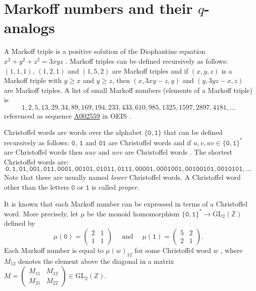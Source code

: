 \documentclass[a4paper,12pt]{amsart}
\newcommand{\GL}{\mathrm{GL}}
\newcommand{\M}{{\mathcal M}}
\newcommand{\0}{\mathtt{0}}
\newcommand{\1}{\mathtt{1}}
\newcommand{\2}{\mathtt{2}}
\newcommand{\3}{\mathtt{3}}
\begin{document}
\section{Markoff numbers and their \texorpdfstring{$q$}{q}-analogs}
\label{sec:Markoff}

A Markoff triple is a positive solution of the Diophantine equation
$x^2+y^2+z^2=3xyz$ \cite{MR1510073,M1879}.
Markoff triples can be defined recursively as follows:
$(1,1,1)$, $(1,2,1)$ and $(1,5,2)$ are Markoff triples and if
$(x,y,z)$ is a Markoff triple with $y\geq x$ and $y\geq z$, then
$(x,3xy-z,y)$ and $(y,3yz-x,z)$ are Markoff triples.
A list of small Markoff numbers (elements of a Markoff triple) is
\[
    1,2,5,13,29,34,89,169,194,233,433,610,985,1325,1597,2897,4181,
    \ldots
\]
referenced as sequence \href{https://oeis.org/A002559}{A002559} in OEIS \cite{OEISA005132}.

Christoffel words are words over the alphabet $\{\0,\1\}$ that can be defined
recursively as follows: $\0$, $\1$ and $\0\1$ are Christoffel words and if
$u,v,uv\in\{\0,\1\}^*$ are Christoffel words then $uuv$ and $uvv$ are Christoffel
words \cite{MR2464862}. The shortest Christoffel words are:
\[
    \0,\1,
    \0\1,
    \0\0\1,\0\1\1,
    \0\0\0\1,\0\0\1\0\1,\0\1\0\1\1,\0\1\1\1,
    \0\0\0\0\1,\0\0\0\1\0\0\1,\0\0\1\0\0\1\0\1,\0\0\1\0\1\0\1,
    \ldots
\]
Note that these are usually named \emph{lower} Christoffel words.
A Christoffel word other than the letters $\0$ or $\1$ is called \emph{proper}.

It is known that each Markoff number can be expressed in terms of a Christoffel
word.
More precisely,
let $\mu$ be the monoid homomorphism $\{\0,\1\}^* \rightarrow \GL_2(\mathbb{Z})$ defined by
\[
    \mu(\0) = \begin{pmatrix} 2 & 1 \\ 1 & 1 \end{pmatrix}
\quad
\text{ and }
\quad
    \mu(\1) = \begin{pmatrix} 5 & 2 \\ 2 & 1 \end{pmatrix}.
\]
Each Markoff number is equal to $\mu(w)_{12}$ for some Christoffel word $w$
\cite{MR2534916},
where
$M_{12}$ denotes
the element above the diagonal in a matrix
$M=\left(\begin{smallmatrix}M_{11}&M_{12}\\M_{21}&M_{22}\end{smallmatrix}\right)\in\GL_2(\mathbb{Z})$.
\end{document}
